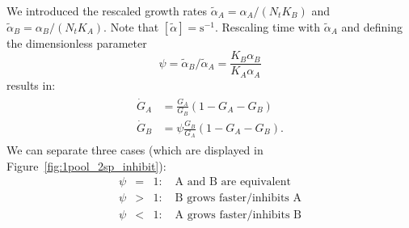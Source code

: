\documentclass[10pt,A4paper]{article}
\numberwithin{equation}{section}
\begin{document}
We introduced the rescaled growth rates $\tilde{\alpha}_A=\alpha_A/(N_tK_B)$ and $\tilde{\alpha}_B=\alpha_B/(N_tK_A)$. Note that $[\tilde{\alpha}]=\mathrm{s}^{-1}$.
Rescaling time with $\tilde{\alpha}_A$ and defining the dimensionless parameter
\begin{equation}
    \psi = \tilde{\alpha}_B/\tilde{\alpha}_A = \frac{K_B\alpha_B}{K_A\alpha_A}
\label{eq:ode_inhib_psi}
\end{equation}
results in: 
\begin{align}
    \begin{split}
        \dot{G}_A &=\frac{G_A}{G_B}\left(1 - G_A-G_B\right)\\
        \dot{G}_B &=\psi\frac{G_B}{G_A}\left(1-G_A-G_B\right). 
    \end{split}
\label{eq:2sp_1pool_inhibit_unitless}
\end{align}
We can separate three cases (which are displayed in Figure~\ref{fig:1pool_2sp_inhibit}):
\begin{eqnarray}
    \psi&=&1:\quad\text{A and B are equivalent}\\
    \psi&>&1:\quad\text{B grows faster/inhibits A}\\
    \psi&<&1:\quad\text{A grows faster/inhibits B}
\end{eqnarray}
%
\end{document}
